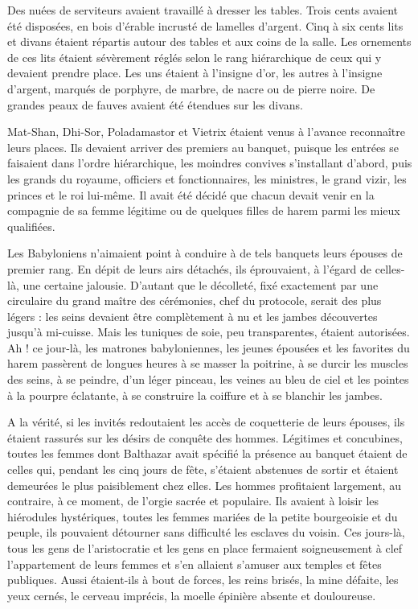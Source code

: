 \documentclass[a4paper, 11pt, oneside, polutonikogreek, french]{article}
\begin{document}
\bigskip
\centerline{\EightStarTaper}
\centerline{\EightStarTaper\EightStarTaper}
\bigskip

Des nuées de serviteurs avaient travaillé à dresser les tables. Trois cents avaient été disposées, en bois d'érable incrusté de lamelles d'argent. Cinq à six cents lits et divans étaient répartis autour des tables et aux coins de la salle. Les ornements de ces lits étaient sévèrement réglés selon le rang hiérarchique de ceux qui y devaient prendre place. Les uns étaient à l'insigne d'or, les autres à l'insigne d'argent, marqués de porphyre, de marbre, de nacre ou de pierre noire. De grandes peaux de fauves avaient été étendues sur les divans.

Mat-Shan, Dhi-Sor, Poladamastor et Vietrix étaient venus à l'avance reconnaître leurs places. Ils devaient arriver des premiers au banquet, puisque les entrées se faisaient dans l'ordre hiérarchique, les moindres convives s'installant d'abord, puis les grands du royaume, officiers et fonctionnaires, les ministres, le grand vizir, les princes et le roi lui-même. Il avait été décidé que chacun devait venir en la compagnie de sa femme légitime ou de quelques filles de harem parmi les mieux qualifiées.

Les Babyloniens n'aimaient point à conduire à de tels banquets leurs épouses de premier rang. En dépit de leurs airs détachés, ils éprouvaient, à l'égard de celles-là, une certaine jalousie. D'autant que le décolleté, fixé exactement par une circulaire du grand maître des cérémonies, chef du protocole, serait des plus légers : les seins devaient être complètement à nu et les jambes découvertes jusqu'à mi-cuisse. Mais les tuniques de soie, peu transparentes, étaient autorisées. Ah ! ce jour-là, les matrones babyloniennes, les jeunes épousées et les favorites du harem passèrent de longues heures à se masser la poitrine, à se durcir les muscles des seins, à se peindre, d'un léger pinceau, les veines au bleu de ciel et les pointes à la pourpre éclatante, à se construire la coiffure et à se blanchir les jambes.

\bigskip
\centerline{\EightStarTaper}
\centerline{\EightStarTaper\EightStarTaper}
\bigskip

A la vérité, si les invités redoutaient les accès de coquetterie de leurs épouses, ils étaient rassurés sur les désirs de conquête des hommes. Légitimes et concubines, toutes les femmes dont Balthazar avait spécifié la présence au banquet étaient de celles qui, pendant les cinq jours de fête, s'étaient abstenues de sortir et étaient demeurées le plus paisiblement chez elles. Les hommes profitaient largement, au contraire, à ce moment, de l'orgie sacrée et populaire. Ils avaient à loisir les hiérodules hystériques, toutes les femmes mariées de la petite bourgeoisie et du peuple, ils pouvaient détourner sans difficulté les esclaves du voisin. Ces jours-là, tous les gens de l'aristocratie et les gens en place fermaient soigneusement à clef l'appartement de leurs femmes et s'en allaient s'amuser aux temples et fêtes publiques. Aussi étaient-ils à bout de forces, les reins brisés, la mine défaite, les yeux cernés, le cerveau imprécis, la moelle épinière absente et douloureuse.
\end{document}
